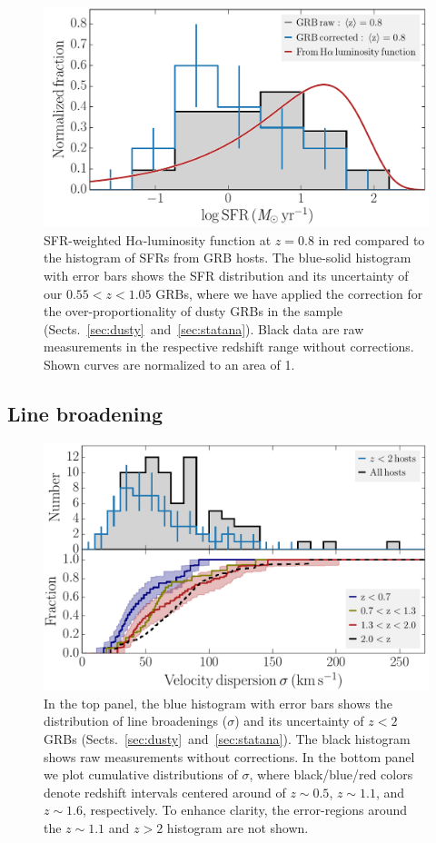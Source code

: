 \documentclass[traditabstract, longauth]{aa}
\newcommand{\ha}{H$\alpha$}
\begin{document}
\begin{figure}
\includegraphics[angle=0, width=0.99\columnwidth]{Figs/SFRvsLFHa.pdf}
\caption{ {SFR-weighted \ha-luminosity function at $z=0.8$ \citep{2011ApJ...726..109L} in red compared to the histogram of SFRs from GRB hosts. The blue-solid histogram with error bars shows the SFR distribution and its uncertainty of our $0.55 < z < 1.05$ GRBs, where we have applied the correction for the over-proportionality of dusty GRBs in the sample (Sects.~\ref{sec:dusty}~and~\ref{sec:statana}). Black data are raw measurements in the respective redshift range without corrections. Shown curves are normalized to an area of 1.}}
\label{fig:sfrhalpha}
\end{figure}

\subsection{Line broadening}
\label{sec:velo}

\begin{figure}
\includegraphics[angle=0, width=0.99\columnwidth]{Figs/Velo_histogram.pdf}
\caption{In the top panel, the blue histogram with error bars shows the distribution of line broadenings ($\sigma$) and its uncertainty of $z < 2$ GRBs (Sects.~\ref{sec:dusty}~and~\ref{sec:statana}). The black histogram shows raw measurements without corrections. In the bottom panel we plot cumulative distributions of $\sigma$, where black/blue/red colors denote redshift intervals centered around of $z\sim0.5$, $z\sim1.1$, and $z\sim1.6$, respectively. To enhance clarity, the error-regions around the $z\sim1.1$ and $z>2$ histogram are not shown.}
\label{fig:velohist}
\end{figure}
\end{document}
